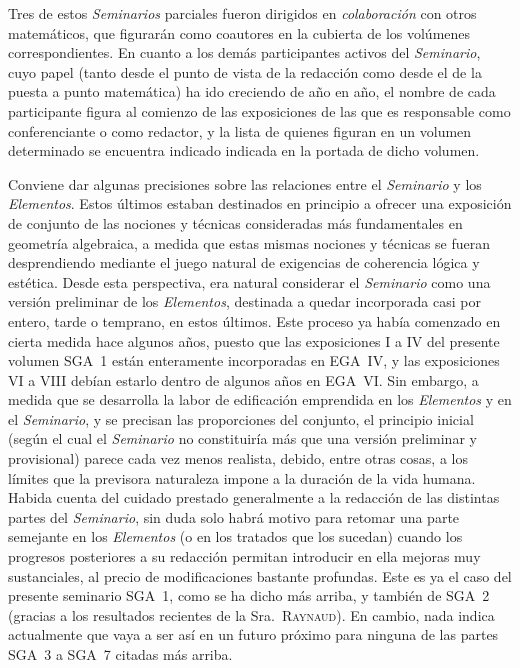 Tres de estos \emph{Seminarios} parciales fueron dirigidos en \emph{colaboración} con otros matemáticos, que figurarán como coautores en la cubierta de los volúmenes correspondientes. En cuanto a los demás participantes activos del \emph{Seminario}, cuyo papel (tanto desde el punto de vista de la redacción como desde el de la puesta a punto matemática) ha ido creciendo de año en año, el nombre de cada participante figura al comienzo de las exposiciones de las que es responsable como conferenciante o como redactor, y la lista de quienes figuran en un volumen determinado se encuentra
{indicado}
{indicada}
en la portada de dicho volumen.

Conviene dar algunas precisiones sobre las relaciones entre el \emph{Seminario} y los \emph{Elementos}. Estos últimos estaban destinados en principio a ofrecer una exposición de conjunto de las nociones y técnicas consideradas más fundamentales en geometría algebraica, a medida que estas mismas nociones y técnicas se fueran desprendiendo mediante el juego natural de exigencias de coherencia lógica y estética. Desde esta perspectiva, era natural considerar el \emph{Seminario} como una versión preliminar de los \emph{Elementos}, destinada a quedar incorporada casi por entero, tarde o temprano, en estos últimos. Este proceso ya había comenzado en cierta medida hace algunos años, puesto que las exposiciones I a IV del presente volumen SGA~1 están enteramente incorporadas en EGA~IV, y las exposiciones VI a VIII debían estarlo dentro de algunos años en EGA~VI. Sin embargo, a medida que se desarrolla la labor de edificación emprendida en los \emph{Elementos} y en el \emph{Seminario}, y se precisan las proporciones del conjunto, el principio inicial (según el cual el \emph{Seminario} no constituiría más que una versión preliminar y provisional) parece cada vez menos realista, debido, entre otras cosas, a los límites que la previsora naturaleza impone a la duración de la vida humana. Habida cuenta del cuidado prestado generalmente a la redacción de las distintas partes del \emph{Seminario}, sin duda solo habrá motivo para retomar una parte semejante en los \emph{Elementos} (o en los tratados que los sucedan) cuando los progresos posteriores a su redacción permitan introducir en ella mejoras muy sustanciales, al precio de modificaciones bastante profundas. Este es ya el caso del presente seminario SGA~1, como se ha dicho más arriba, y también de SGA~2 (gracias a los resultados recientes de la Sra.~\textsc{Raynaud}). En cambio, nada indica actualmente que vaya a ser así en un futuro próximo para ninguna de las partes SGA~3 a SGA~7 citadas más arriba.

